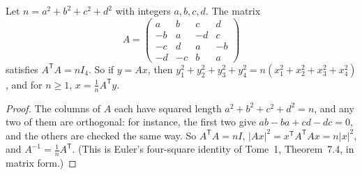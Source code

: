 \begin{lemma}\label{lem:fourmatrix}
Let $n=a^2+b^2+c^2+d^2$ with integers $a,b,c,d$. The matrix
\[
A=\begin{pmatrix}a&b&c&d\\-b&a&-d&c\\-c&d&a&-b\\-d&-c&b&a\end{pmatrix}
\]
satisfies $A^{\mathsf T}A=nI_4$. So if $y=Ax$, then $y_1^2+y_2^2+y_3^2+y_4^2=n(x_1^2+x_2^2+x_3^2+x_4^2)$, and for $n\ge1$, $x=\frac1nA^{\mathsf T}y$.
\end{lemma}
\begin{proof}
The columns of $A$ each have squared length $a^2+b^2+c^2+d^2=n$, and any two of them are orthogonal: for instance, the first two give $ab-ba+cd-dc=0$, and the others are checked the same way. So
$A^{\mathsf T}A=nI$, $|Ax|^2=x^{\mathsf T}A^{\mathsf T}Ax=n|x|^2$, and $A^{-1}=\frac1nA^{\mathsf T}$. (This is Euler's four-square identity of Tome~1, Theorem~7.4, in matrix form.)
\end{proof}

